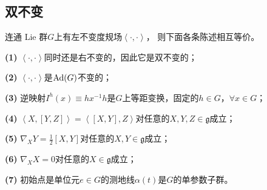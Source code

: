 \subsection{双不变}

\begin{theorem}\label{chlg:thm_biinmg}
    连通 Lie 群$G$上有左不变度规场$\left<\cdot,\cdot\right>$，
    则下面各条陈述相互等价。
    
    {\bfseries (1)} $\left<\cdot,\cdot\right>$同时还是右不变的，因此它是双不变的；
    
    {\bfseries (2)} $\left<\cdot,\cdot\right>$是${\rm Ad}(G)$不变的；
    
    {\bfseries (3)} 逆映射$I^h(x)\equiv h  x^{-1} h $是$G$上等距变换，固定的$h\in G$，$\forall x\in G$；
    
    {\bfseries (4)} $\left<X,[Y,Z]\right>=\left<[X,Y],Z\right>$对任意的$X,Y,Z\in \mathfrak{g}$成立；
    
    {\bfseries (5)} $\nabla_X Y = \frac{1}{2} [X,Y]$对任意的$X,Y\in \mathfrak{g}$成立；
    
    {\bfseries (6)} $\nabla_X X = 0$对任意的$X\in \mathfrak{g}$成立；
    
    {\bfseries (7)} 初始点是单位元$e\in G$的测地线$\alpha(t)$是$G$的单参数子群。
\end{theorem}
